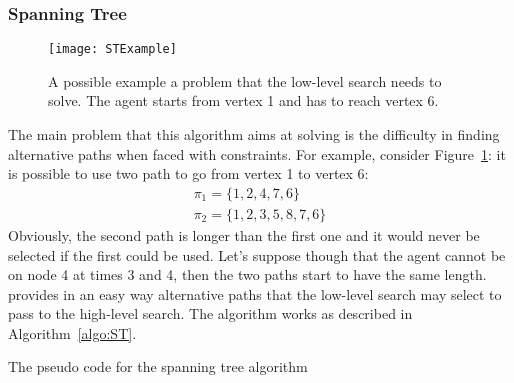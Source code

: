 \subsubsection{Spanning Tree}
\begin{figure}[tb]
  \centering
  \texttt{[image: STExample]}
  \caption{A possible example a  problem that the low-level search
  needs to solve. The agent starts from vertex 1 and has to reach vertex 6.}
  \label{fig:STExample}
\end{figure}
The main problem that this algorithm aims at solving is the difficulty in
finding alternative paths when faced with constraints. For example, consider
Figure~\ref{fig:STExample}: it is possible to use two path to go from vertex 1
to vertex 6:
\[
  \begin{array}{l}
    \pi_1 = \{1,2,4,7,6\}\\
    \pi_2 = \{1,2,3,5,8,7,6\}
  \end{array}
\]
Obviously, the second path is longer than the first one and it would never be
selected if the first could be used. Let's suppose though that the agent cannot
be on node 4 at times 3 and 4, then the two paths start to have the same 
length. \newline
{} provides in an easy way alternative paths that the
low-level search may select to pass to the high-level search. The algorithm
works as described in Algorithm~\ref{algo:ST}.
\begin{algorithm}[t]
  \DontPrintSemicolon
  \caption{The pseudo code for the spanning tree algorithm}
  \label{algo:ST}

  \;
  \;
\end{algorithm}
